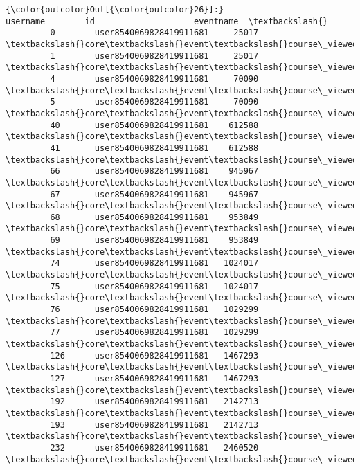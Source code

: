 \documentclass[11pt]{article}
\begin{document}
\begin{Verbatim}[commandchars=\\\{\}]
{\color{outcolor}Out[{\color{outcolor}26}]:}                         username        id                    eventname  \textbackslash{}
         0        user8540069828419911681     25017    \textbackslash{}core\textbackslash{}event\textbackslash{}course\_viewed   
         1        user8540069828419911681     25017    \textbackslash{}core\textbackslash{}event\textbackslash{}course\_viewed   
         4        user8540069828419911681     70090    \textbackslash{}core\textbackslash{}event\textbackslash{}course\_viewed   
         5        user8540069828419911681     70090    \textbackslash{}core\textbackslash{}event\textbackslash{}course\_viewed   
         40       user8540069828419911681    612588    \textbackslash{}core\textbackslash{}event\textbackslash{}course\_viewed   
         41       user8540069828419911681    612588    \textbackslash{}core\textbackslash{}event\textbackslash{}course\_viewed   
         66       user8540069828419911681    945967    \textbackslash{}core\textbackslash{}event\textbackslash{}course\_viewed   
         67       user8540069828419911681    945967    \textbackslash{}core\textbackslash{}event\textbackslash{}course\_viewed   
         68       user8540069828419911681    953849    \textbackslash{}core\textbackslash{}event\textbackslash{}course\_viewed   
         69       user8540069828419911681    953849    \textbackslash{}core\textbackslash{}event\textbackslash{}course\_viewed   
         74       user8540069828419911681   1024017    \textbackslash{}core\textbackslash{}event\textbackslash{}course\_viewed   
         75       user8540069828419911681   1024017    \textbackslash{}core\textbackslash{}event\textbackslash{}course\_viewed   
         76       user8540069828419911681   1029299    \textbackslash{}core\textbackslash{}event\textbackslash{}course\_viewed   
         77       user8540069828419911681   1029299    \textbackslash{}core\textbackslash{}event\textbackslash{}course\_viewed   
         126      user8540069828419911681   1467293    \textbackslash{}core\textbackslash{}event\textbackslash{}course\_viewed   
         127      user8540069828419911681   1467293    \textbackslash{}core\textbackslash{}event\textbackslash{}course\_viewed   
         192      user8540069828419911681   2142713    \textbackslash{}core\textbackslash{}event\textbackslash{}course\_viewed   
         193      user8540069828419911681   2142713    \textbackslash{}core\textbackslash{}event\textbackslash{}course\_viewed   
         232      user8540069828419911681   2460520    \textbackslash{}core\textbackslash{}event\textbackslash{}course\_viewed   

\end{Verbatim}
\end{document}
